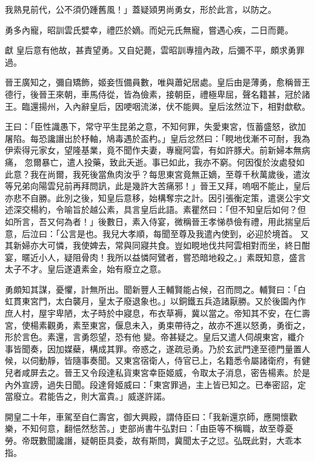 \begin{pinyinscope}
 我熟見前代，公不須仍踵舊風！」蓋疑熲男尚勇女，形於此言，以防之。



 勇多內寵，昭訓雲氏嬖幸，禮匹於嫡。而妃元氏無寵，嘗遇心疾，二日而薨。



 獻
 皇后意有他故，甚責望勇。又自妃薨，雲昭訓專擅內政，后彌不平，頗求勇罪過。



 晉王廣知之，彌自矯飾，姬妾恆備員數，唯與蕭妃居處。皇后由是薄勇，愈稱晉王德行，後晉王來朝，車馬侍從，皆為儉素，接朝臣，禮極卑屈，聲名籍甚，冠於諸王。臨還揚州，入內辭皇后，因哽咽流涕，伏不能興。皇后泫然泣下，相對歔欷。



 王曰：「臣性識愚下，常守平生昆弟之意，不知何罪，失愛東宮，恆蓄盛怒，欲加屠陷。每恐讒譖出於杼軸，鳩毒遇於盃杓。」皇后忿然曰：「睍地伐漸不可耐，我為伊索得元家女，望隆基業，竟不聞作夫妻，專寵阿雲，有如許豚犬。前新婦本無病痛，
 忽爾暴亡，遣人投藥，致此夭逝。事已如此，我亦不窮。何因復於汝處發如此意？我在尚爾，我死後當魚肉汝乎？每思東宮竟無正嫡，至尊千秋萬歲後，遣汝等兄弟向陽雲兒前再拜問訊，此是幾許大苦痛邪！」晉王又拜，嗚咽不能止，皇后亦悲不自勝。此別之後，知皇后意移，始構奪宗之計。因引張衡定策，遣褒公宇文述深交楊約，令喻旨於越公素，具言皇后此語。素瞿然曰：「但不知皇后如何？但如所言，吾又何為者！」後數日，素入侍宴，微稱晉王孝悌恭儉有禮，用此揣皇后意，后泣曰：「公言是也。我兒大孝順，每聞至尊及我遣內使到，必迎於境首。
 又其新婦亦大可憐，我使婢去，常與同寢共食。豈如睍地伐共阿雲相對而坐，終日酣宴，暱近小人，疑阻骨肉！我所以益憐阿鷿者，嘗恐暗地殺之。」素既知意，盛言太子不才。皇后遂遺素金，始有廢立之意。



 勇頗知其謀，憂懼，計無所出。聞新豐人王輔賢能占候，召而問之。輔賢曰：「白虹貫東宮門，太白襲月，皇太子廢退象也。」以銅鐵五兵造諸厭勝。又於後園內作庶人村，屋宇卑陋，太子時於中寢息，布衣草褥，冀以當之。帝知其不安，在仁壽宮，使楊素觀勇，素至東宮，偃息未入，勇束帶待之，故亦不進以怒勇，勇銜之，形於言色。素還，言勇怨望，恐有他
 變。帝甚疑之。皇后又遣人伺覘東宮，纖介事皆聞奏，因加媒蘗，構成其罪。帝惑之，遂疏忌勇。乃於玄武門達至德門量置人候，以伺動靜，皆隨事奏聞。又東宮宿衛人，侍官已上，名籍悉令屬諸衛府，有健兒者咸屏去之。晉王又令段達私貨東宮幸臣姬威，令取太子消息，密告楊素。於是內外宣謗，過失日聞。段達脅姬威曰：「東宮罪過，主上皆已知之。已奉密詔，定當廢立。君能告之，則大富貴。」威遂許諾。



 開皇二十年，車駕至自仁壽宮，御大興殿，謂侍臣曰：「我新還京師，應開懷歡樂，不知何意，翻悒然愁苦。」吏部尚書牛弘對曰：「由臣等不稱職，故至尊憂
 勞。帝既數聞讒譖，疑朝臣具委，故有斯問，冀聞太子之愆。弘既此對，大乖本指。




\end{pinyinscope}
